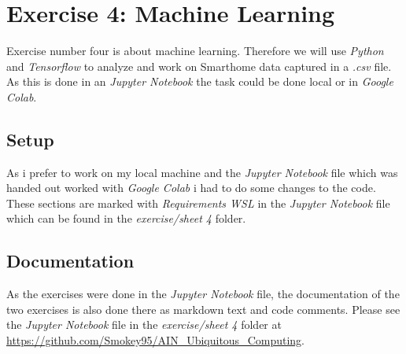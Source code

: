 \section{Exercise 4: Machine Learning}
Exercise number four is about machine learning. Therefore we will use \textit{Python} and \textit{Tensorflow} 
to analyze and work on Smarthome data captured in a \textit{.csv} file. 
As this is done in an \textit{Jupyter Notebook} the task could be done local or in \textit{Google Colab}.

\subsection{Setup}
As i prefer to work on my local machine and the \textit{Jupyter Notebook} file which was handed out 
worked with \textit{Google Colab} i had to do some changes to the code.
These sections are marked with \textit{Requirements WSL} in the \textit{Jupyter Notebook} file 
which can be found in the \textit{exercise/sheet 4} folder.

\subsection{Documentation}
As the exercises were done in the \textit{Jupyter Notebook} file, the documentation of the two exercises 
is also done there as markdown text and code comments.
Please see the \textit{Jupyter Notebook} file in the \textit{exercise/sheet 4} folder at 
\url{https://github.com/Smokey95/AIN_Ubiquitous_Computing}.
